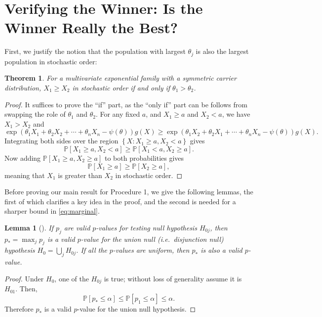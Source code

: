 \documentclass[11pt]{article}
\newtheorem{lemma}[corollary]{Lemma}
\newtheorem{theorem}[corollary]{Theorem}
\theoremstyle{definition}
\theoremstyle{custom}
\newcommand{\PP}{\mathbb{P}}
\begin{document}
\section{Verifying the Winner: Is the Winner Really the Best?}
\label{sec:winnerbest}

First, we justify the notion that the population with largest $\theta_j$ is also the largest population in stochastic order:
\begin{theorem}
For a multivariate exponential family with a symmetric carrier distribution, $X_1 \ge X_2$ in stochastic order if and only if $\theta_1 > \theta_2$.
\label{thm:stoch}
\end{theorem}

\begin{proof}
It suffices to prove the ``if'' part, as the ``only if'' part can be follows from swapping the role of $\theta_1$ and $\theta_2$. For any fixed $a$, and $X_1 \ge a$ and $X_2 < a$, we have $X_1 > X_2$ and
$$\exp\left(\theta_1 X_1 + \theta_2 X_2 + \cdots + \theta_n X_n - \psi\left(\theta\right)\right) g\left(X\right) \ge \exp\left(\theta_1 X_2 + \theta_2 X_1 + \cdots + \theta_n X_n - \psi\left(\theta\right)\right) g\left(X\right).$$
Integrating both sides over the region $\left\{X: X_1 \ge a, X_2 < a\right\}$ gives
$$\PP\left[X_1 \ge a, X_2 < a\right] \ge \PP\left[X_1 < a, X_2 \ge a\right].$$
Now adding $\PP\left[X_1 \ge a, X_2 \ge a\right]$ to both probabilities gives
$$\PP\left[X_1 \ge a\right] \ge \PP\left[X_2 \ge a\right],$$
meaning that $X_1$ is greater than $X_2$ in stochastic order.
\end{proof}

Before proving our main result for Procedure 1, we give the following lemmas, the first of which clarifies a key idea in the proof, and the second is needed for a sharper bound in \eqref{eq:marginal}.

\begin{lemma}[\citealp{Berger:1982hy}]
If $p_j$ are valid $p$-values for testing null hypothesis $H_{0j}$, then $p_* = \max_j p_j$ is a valid $p$-value for the union null (i.e.\ disjunction null) hypothesis $H_0 = \bigcup_j H_{0j}$. If all the $p$-values are uniform, then $p_*$ is also a valid $p$-value.
\label{lma:union}
\end{lemma}

\begin{proof}
Under $H_0$, one of the $H_{0j}$ is true; without loss of generality assume it is $H_{01}$. Then,
$$\PP\left[p_* \le \alpha\right] \le \PP\left[p_1 \le \alpha\right] \le \alpha.$$
Therefore $p_*$ is a valid $p$-value for the union null hypothesis.
\end{proof}
\end{document}
